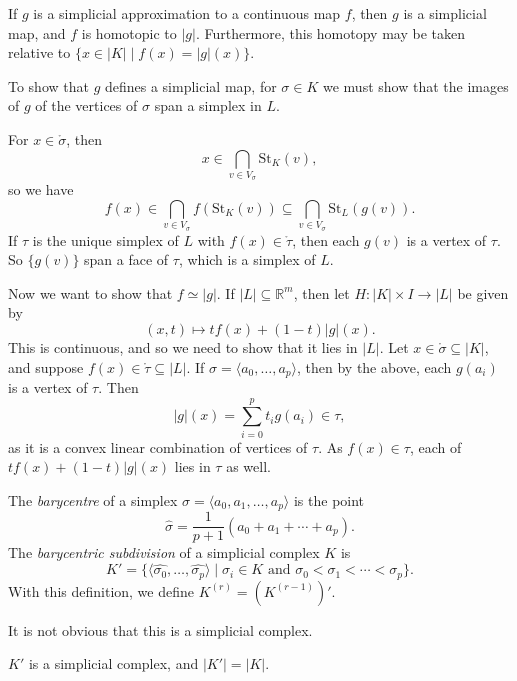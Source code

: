 \documentclass[12pt]{article}
\begin{document}
\begin{lemma}
	If $g$ is a simplicial approximation to a continuous map $f$, then $g$ is a simplicial map, and $f$ is homotopic to $|g|$. Furthermore, this homotopy may be taken relative to $\{x \in |K| \mid f(x) = |g|(x)\}$.
\end{lemma}

\begin{proofbox}
	To show that $g$ defines a simplicial map, for $\sigma \in K$ we must show that the images of $g$ of the vertices of $\sigma$ span a simplex in $L$.

	For $x \in \mathring \sigma$, then
	\[
	x \in \bigcap_{v \in V_\sigma} \mathrm{St}_K(v),
	\]
	so we have
	\[
	f(x) \in \bigcap_{v \in V_\sigma}f(\mathrm{St}_K(v)) \subseteq \bigcap_{v \in V_\sigma} \mathrm{St}_L(g(v)).
	\]
	If $\tau$ is the unique simplex of $L$ with $f(x) \in \mathring \tau$, then each $g(v)$ is a vertex of $\tau$. So $\{g(v)\}$ span a face of $\tau$, which is a simplex of $L$.

	Now we want to show that $f \simeq |g|$. If $|L| \subseteq \mathbb{R}^m$, then let $H : |K| \times I \to |L|$ be given by
	\[
		(x, t) \mapsto t f(x) + (1 - t)|g|(x).
	\]
	This is continuous, and so we need to show that it lies in $|L|$. Let $x \in \mathring \sigma \subseteq |K|$, and suppose $f(x) \in \mathring \tau \subseteq |L|$. If $\sigma = \langle a_0, \ldots, a_p\rangle$, then by the above, each $g(a_i)$ is a vertex of $\tau$. Then
	\[
	|g|(x) = \sum_{i = 0}^p t_i g(a_i) \in \tau,
	\]
	as it is a convex linear combination of vertices of $\tau$. As $f(x) \in \tau$, each of $t f(x) + (1-t) |g|(x)$ lies in $\tau$ as well.
\end{proofbox}

\begin{definition}
	The \emph{barycentre} of a simplex $\sigma = \langle a_0, a_1, \ldots, a_p \rangle$ is the point
	\[
	\hat \sigma = \frac{1}{p+1}(a_0 + a_1 + \cdots + a_p).
	\]
	The \emph{barycentric subdivision} of a simplicial complex $K$ is
	\[
		K' = \{ \langle \hat{\sigma_0}, \ldots, \hat{\sigma_p} \rangle \mid \sigma_i \in K \text{ and } \sigma_0 < \sigma_1 < \cdots < \sigma_p\}.
	\]
	With this definition, we define $K^{(r)} = (K^{(r-1)})'$.
\end{definition}

It is not obvious that this is a simplicial complex.

\begin{proposition}
	$K'$ is a simplicial complex, and $|K'| = |K|$.
\end{proposition}
\end{document}
